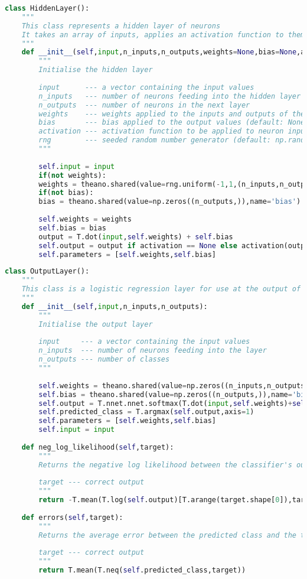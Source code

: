 \newpage
\begin{lstlisting}[language=Python, caption=Hidden Layer, captionpos=b, label={list:mlp_hidden}]
class HiddenLayer():
	"""
	This class represents a hidden layer of neurons
	It takes an array of inputs, applies an activation function to them, and returns the output
	"""
	def __init__(self,input,n_inputs,n_outputs,weights=None,bias=None,activation=T.tanh,rng=np.random.RandomState(2)):
		"""
		Initialise the hidden layer
		
		input      --- a vector containing the input values
		n_inputs   --- number of neurons feeding into the hidden layer
		n_outputs  --- number of neurons in the next layer
		weights    --- weights applied to the inputs and outputs of the hidden layer (default: None)
		bias       --- bias applied to the output values (default: None)
		activation --- activation function to be applied to neuron inputs (default: tanh)
		rng        --- seeded random number generator (default: np.random.RandomState(2))
		"""
		
		self.input = input
		if(not weights):
		weights = theano.shared(value=rng.uniform(-1,1,(n_inputs,n_outputs)),name = 'weights')
		if(not bias):
		bias = theano.shared(value=np.zeros((n_outputs,)),name='bias')
		
		self.weights = weights
		self.bias = bias
		output = T.dot(input,self.weights) + self.bias
		self.output = output if activation == None else activation(output) 
		self.parameters = [self.weights,self.bias]
\end{lstlisting}
\newpage
\begin{lstlisting}[language=Python, caption=Output Layer, captionpos=b, label={list:mlp_output}]
class OutputLayer():
	"""
	This class is a logistic regression layer for use at the output of a neural network
	"""
	def __init__(self,input,n_inputs,n_outputs):
		"""
		Initialise the output layer
		
		input     --- a vector containing the input values
		n_inputs  --- number of neurons feeding into the layer
		n_outputs --- number of classes
		"""
		
		self.weights = theano.shared(value=np.zeros((n_inputs,n_outputs)),name='weights')
		self.bias = theano.shared(value=np.zeros((n_outputs,)),name='bias')
		self.output = T.nnet.nnet.softmax(T.dot(input,self.weights)+self.bias)
		self.predicted_class = T.argmax(self.output,axis=1)
		self.parameters = [self.weights,self.bias]
		self.input = input
	
	def neg_log_likelihood(self,target):
		"""
		Returns the negative log likelihood between the classifier's output and a target
		
		target --- correct output
		"""
		return -T.mean(T.log(self.output)[T.arange(target.shape[0]),target])     
	
	def errors(self,target):
		"""
		Returns the average error between the predicted class and the target class
		
		target --- correct output
		"""
		return T.mean(T.neq(self.predicted_class,target))     
\end{lstlisting}
